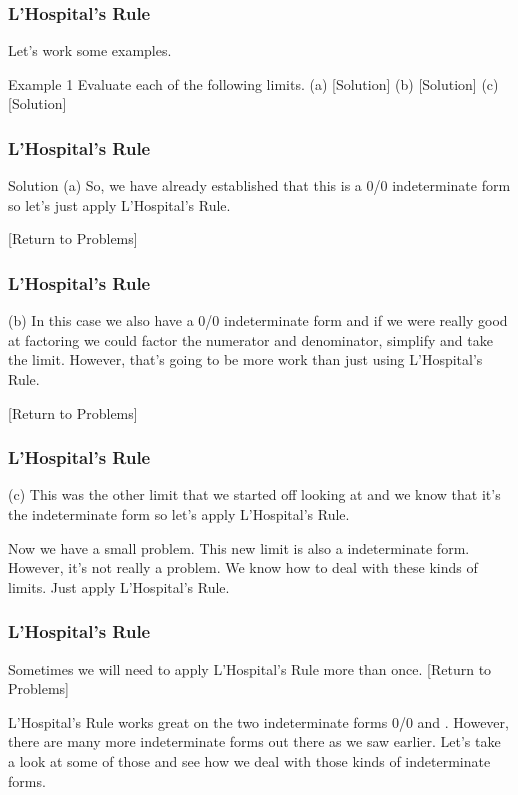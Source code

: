 \documentclass{beamer}
\begin{document}
\begin{frame}
	\frametitle{L’Hospital’s Rule}
	\large
Let’s work some examples.
 
Example 1  Evaluate each of the following limits.
(a)    [Solution]
(b)    [Solution]
(c)    [Solution]
\end{frame}
\begin{frame}
	\frametitle{L’Hospital’s Rule}
	\large
	 
Solution
(a) 
So, we have already established that this is a 0/0 indeterminate form so let’s just apply L’Hospital’s Rule.
                                                   
[Return to Problems]
\end{frame}
\begin{frame}
	\frametitle{L’Hospital’s Rule}
	\large
(b) 
In this case we also have a 0/0 indeterminate form and if we were really good at factoring we could factor the numerator and denominator, simplify and take the limit.  However, that’s going to be more work than just using L’Hospital’s Rule.
 
                                   
[Return to Problems]
\end{frame}
\begin{frame}
	\frametitle{L’Hospital’s Rule}
	\large
(c) 
This was the other limit that we started off looking at and we know that it’s the indeterminate form  so let’s apply L’Hospital’s Rule.
                                                            
Now we have a small problem.  This new limit is also a  indeterminate form. However, it’s not really a problem.  We know how to deal with these kinds of limits.  Just apply L’Hospital’s Rule. 
                                                 
 \end{frame}
 \begin{frame}
 	\frametitle{L’Hospital’s Rule}
 	\large
Sometimes we will need to apply L’Hospital’s Rule more than once.
[Return to Problems]
 
L’Hospital’s Rule works great on the two indeterminate forms 0/0 and .  However, there are many more indeterminate forms out there as we saw earlier.  Let’s take a look at some of those and see how we deal with those kinds of indeterminate forms.
\end{frame}
\end{document}

